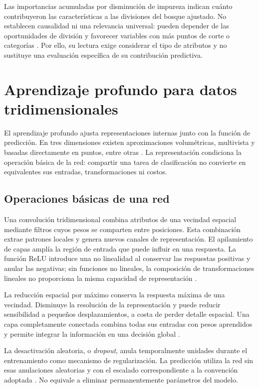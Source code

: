 Las importancias acumuladas por disminución de impureza indican cuánto contribuyeron las características a las divisiones del bosque ajustado. No establecen causalidad ni una relevancia universal: pueden depender de las oportunidades de división y favorecer variables con más puntos de corte o categorías \parencite{strobl2007}. Por ello, su lectura exige considerar el tipo de atributos y no sustituye una evaluación específica de su contribución predictiva.

\section[Aprendizaje profundo para datos tridimensionales]
{Aprendizaje profundo para datos\\ tridimensionales}
\label{sec:aprendizaje-profundo-3d}
El aprendizaje profundo ajusta representaciones internas junto con la función de predicción. En tres dimensiones existen aproximaciones volumétricas, multivista y basadas directamente en puntos, entre otras \parencite{wu2015,su2015,qi2017}. La representación condiciona la operación básica de la red: compartir una tarea de clasificación no convierte en equivalentes sus entradas, transformaciones ni costos.

\subsection{Operaciones básicas de una red}
Una convolución tridimensional combina atributos de una vecindad espacial mediante filtros cuyos pesos se comparten entre posiciones. Esta combinación extrae patrones locales y genera nuevos canales de representación. El apilamiento de capas amplía la región de entrada que puede influir en una respuesta. La función ReLU introduce una no linealidad al conservar las respuestas positivas y anular las negativas; sin funciones no lineales, la composición de transformaciones lineales no proporciona la misma capacidad de representación \parencite{goodfellow2016}.

La reducción espacial por máximo conserva la respuesta máxima de una vecindad. Disminuye la resolución de la representación y puede reducir sensibilidad a pequeños desplazamientos, a costa de perder detalle espacial. Una capa completamente conectada combina todas sus entradas con pesos aprendidos y permite integrar la información en una decisión global \parencite{goodfellow2016}.

La desactivación aleatoria, o \textit{dropout}, anula temporalmente unidades durante el entrenamiento como mecanismo de regularización. La predicción utiliza la red sin esas anulaciones aleatorias y con el escalado correspondiente a la convención adoptada \parencite{srivastava2014}. No equivale a eliminar permanentemente parámetros del modelo.

